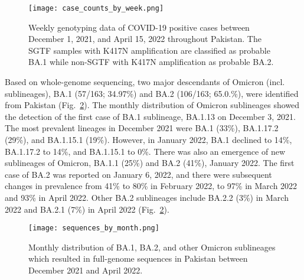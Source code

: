 \begin{figure}[ht]
   \centering
   \texttt{[image: case\_counts\_by\_week.png]}
    \caption[Case counts December 2021--April 2022]{Weekly genotyping data of COVID-19 positive cases between December 1, 2021, and April 15, 2022 throughout Pakistan. The SGTF samples with K417N amplification are classified as probable BA.1 while non-SGTF with K417N amplification as probable BA.2.}
    \label{fig:genotyped}
\end{figure}

Based on whole-genome sequencing, two major descendants of Omicron (incl. sublineages), BA.1 (57/163; 34.97\%) and BA.2 (106/163; 65.0.\%), were identified from Pakistan (Fig.~\ref{fig:sublineages}).
The monthly distribution of Omicron sublineages showed the detection of the first case of BA.1 sublineage, BA.1.13 on December 3, 2021.
The most prevalent lineages in December 2021 were BA.1 (33\%), BA.1.17.2 (29\%), and BA.1.15.1 (19\%).
However, in January 2022, BA.1 declined to 14\%, BA.1.17.2 to 14\%, and BA.1.15.1 to 0\%.
There was also an emergence of new sublineages of Omicron, BA.1.1 (25\%) and BA.2 (41\%), January 2022.
The first case of BA.2 was reported on January 6, 2022, and there were subsequent changes in prevalence from 41\% to 80\% in February 2022, to 97\% in March 2022 and 93\% in April 2022.
Other BA.2 sublineages include BA.2.2 (3\%) in March 2022 and BA.2.1 (7\%) in April 2022 (Fig.~\ref{fig:sublineages}).

\begin{figure}[ht]
   \centering
   \texttt{[image: sequences\_by\_month.png]}
    \caption[Omicron lineage distribution]{Monthly distribution of BA.1, BA.2, and other Omicron sublineages which resulted in full-genome sequences in Pakistan between December 2021 and April 2022.}
    \label{fig:sublineages}
\end{figure}


